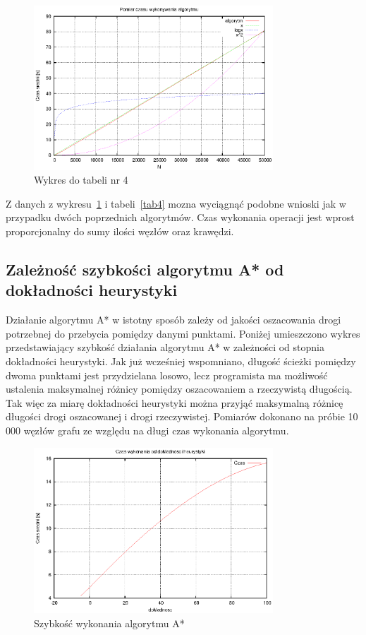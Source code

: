 \documentclass[a4paper,11pt]{article}
\begin{document}
\begin{enumerate}
    \begin{figure}[th]
\centering
\includegraphics[width=0.8\textwidth]{../prj/wykres16.eps}
\caption{Wykres do tabeli nr 4}
\label{Wykres4}
\end{figure} 
Z danych z wykresu~\ref{Wykres4} i tabeli~\ref{tab4} mozna wyciągnąć podobne wnioski jak w przypadku dwóch poprzednich algorytmów. Czas wykonania operacji jest wprost proporcjonalny do sumy ilości węzłów oraz krawędzi.

\subsection{Zależność szybkości algorytmu A* od dokładności heurystyki}

Działanie algorytmu A* w istotny sposób zależy od jakości oszacowania drogi potrzebnej do przebycia pomiędzy danymi punktami. Poniżej umieszczono 
wykres przedstawiający szybkość działania algorytmu A* w zależności od stopnia dokładności heurystyki. 
Jak już wcześniej wspomniano, długość ścieżki pomiędzy dwoma punktami jest przydzielana losowo, lecz programista ma możliwość ustalenia 
maksymalnej różnicy pomiędzy oszacowaniem a rzeczywistą długością. Tak więc za miarę dokładności heurystyki można przyjąć maksymalną różnicę długości 
drogi oszacowanej i drogi rzeczywistej. Pomiarów dokonano na próbie 10 000 węzłów grafu ze względu na długi czas wykonania algorytmu.

  \begin{figure}[th]
\centering
\includegraphics[width=0.8\textwidth]{../prj/wykres_a.eps}
\caption{Szybkość wykonania algorytmu A*}
\label{Wykres5}


\end{figure}
\end{enumerate}
\end{document}
